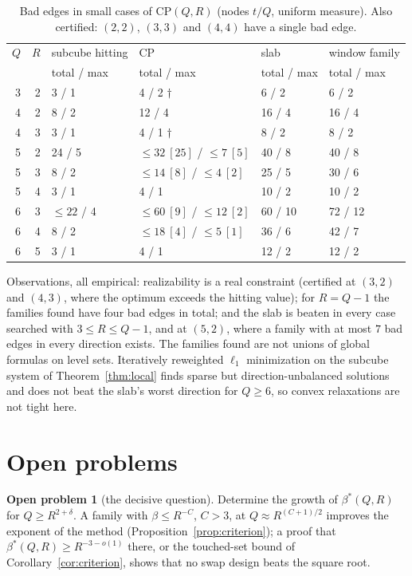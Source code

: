 \documentclass[11pt]{article}
\theoremstyle{definition}
\newtheorem{problem}{Open problem}
\theoremstyle{remark}
\newcommand{\CP}{\mathrm{CP}}
\begin{document}
\begin{table}[h]
\centering\small
\begin{tabular}{rrllll}
\toprule
$Q$ & $R$ & subcube hitting & $\CP$ & slab & window family\\
 & & total / max & total / max & total / max & total / max\\
\midrule
3 & 2 & 3 / 1 & 4 / 2 $\dagger$ & 6 / 2 & 6 / 2\\
4 & 2 & 8 / 2 & 12 / 4 & 16 / 4 & 16 / 4\\
4 & 3 & 3 / 1 & 4 / 1 $\dagger$ & 8 / 2 & 8 / 2\\
5 & 2 & 24 / 5 & $\le32\ [25]$ / $\le7\ [5]$ & 40 / 8 & 40 / 8\\
5 & 3 & 8 / 2 & $\le14\ [8]$ / $\le4\ [2]$ & 25 / 5 & 30 / 6\\
5 & 4 & 3 / 1 & 4 / 1 & 10 / 2 & 10 / 2\\
6 & 3 & $\le22$ / 4 & $\le60\ [9]$ / $\le12\ [2]$ & 60 / 10 & 72 / 12\\
6 & 4 & 8 / 2 & $\le18\ [4]$ / $\le5\ [1]$ & 36 / 6 & 42 / 7\\
6 & 5 & 3 / 1 & 4 / 1 & 12 / 2 & 12 / 2\\
\bottomrule
\end{tabular}
\caption{Bad edges in small cases of $\CP(Q,R)$ (nodes $t/Q$, uniform measure). Also certified: $(2,2)$, $(3,3)$ and $(4,4)$ have a single bad edge.}\label{tab:data}
\end{table}

Observations, all empirical: realizability is a real constraint (certified at $(3,2)$ and $(4,3)$, where the optimum exceeds the hitting value); for $R=Q-1$ the families found have four bad edges in total; and the slab is beaten in every case searched with $3\le R\le Q-1$, and at $(5,2)$, where a family with at most $7$ bad edges in every direction exists. The families found are not unions of global formulas on level sets. Iteratively reweighted $\ell_1$ minimization on the subcube system of Theorem~\ref{thm:local} finds sparse but direction-unbalanced solutions and does not beat the slab's worst direction for $Q\ge6$, so convex relaxations are not tight here.

\section{Open problems}\label{sec:open}

\begin{problem}[the decisive question]
Determine the growth of $\beta^*(Q,R)$ for $Q\ge R^{2+\delta}$. A family with $\beta\le R^{-C}$, $C>3$, at $Q\approx R^{(C+1)/2}$ improves the exponent of the method (Proposition~\ref{prop:criterion}); a proof that $\beta^*(Q,R)\ge R^{-3-o(1)}$ there, or the touched-set bound of Corollary~\ref{cor:criterion}, shows that no swap design beats the square root.
\end{problem}
\end{document}
